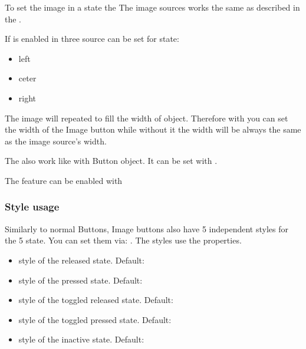 \documentclass[letterpaper,10pt,english]{sphinxmanual}
\begin{document}
To set the image in a state the  The image sources works the same as described in the {\hyperref[\detokenize{object-types/img::doc}]{}}.

If  is enabled in  three source can be set for state:
\begin{itemize}
\item {} 
left

\item {} 
ceter

\item {} 
right

\end{itemize}

The  image will repeated to fill the width of object. Therefore with  you can set the width of the Image button while without it the width will be always the same as the image source’s width.

The  also work like with Button object. It can be set with .

The  feature can be enabled with 


\subsubsection{Style usage}
\label{\detokenize{object-types/imgbtn:style-usage}}
Similarly to normal Buttons, Image buttons also have 5 independent styles for the 5 state. You can set them via: . The styles use the  properties.
\begin{itemize}
\item {} 
 style of the released state. Default: 

\item {} 
 style of the pressed state. Default: 

\item {} 
 style of the toggled released state. Default: 

\item {} 
 style of the toggled pressed state. Default: 

\item {} 
 style of the inactive state. Default: 

\end{itemize}
\end{document}
